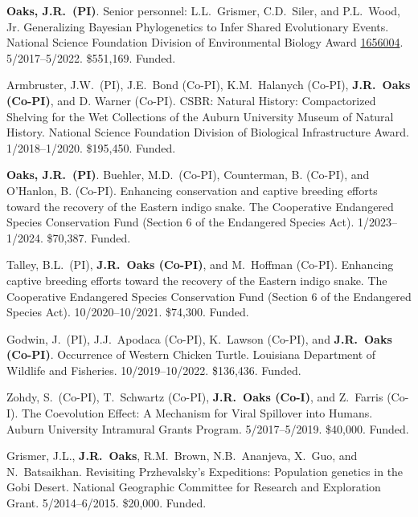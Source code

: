 \myHangIndent
\textbf{Oaks, J.R.\ (PI)}.
Senior personnel: L.L.\ Grismer, C.D.\ Siler, and \postdocsymbol{}P.L.\ Wood, Jr.
Generalizing Bayesian Phylogenetics to Infer Shared Evolutionary Events.
National Science Foundation Division of Environmental Biology Award
\href{https://www.nsf.gov/awardsearch/showAward?AWD_ID=1656004&HistoricalAwards=false}{1656004}.
5/2017--5/2022.
\$551,169.
Funded.

\myHangIndent
Armbruster, J.W.\ (PI),
J.E.\ Bond (Co-PI),
K.M.\ Halanych (Co-PI),
\textbf{J.R.\ Oaks (Co-PI)},
and
D. Warner (Co-PI).
CSBR: Natural History: Compactorized Shelving for the Wet Collections of the
Auburn University Museum of Natural History.
National Science Foundation Division of Biological Infrastructure Award.
1/2018--1/2020.
\$195,450.
Funded.


\myHangIndent
\textbf{Oaks, J.R.\ (PI)}.
\phdsymbol{}Buehler, M.D.\ (Co-PI),
Counterman, B. (Co-PI),
and
O'Hanlon, B. (Co-PI).
Enhancing conservation and captive breeding efforts toward the recovery of the Eastern indigo snake.
The Cooperative Endangered Species Conservation Fund (Section 6 of the
Endangered Species Act).
1/2023--1/2024.
\$70,387.
Funded.

\myHangIndent
Talley, B.L.\ (PI),
\textbf{J.R.\ Oaks (Co-PI)},
and
M.\ Hoffman (Co-PI).
Enhancing captive breeding efforts toward the recovery of the Eastern indigo snake.
The Cooperative Endangered Species Conservation Fund (Section 6 of the
Endangered Species Act).
10/2020--10/2021.
\$74,300.
Funded.

\myHangIndent
Godwin, J.\ (PI),
J.J.\ Apodaca (Co-PI),
K.\ Lawson (Co-PI),
and
\textbf{J.R.\ Oaks (Co-PI)}.
Occurrence of Western Chicken Turtle.
Louisiana Department of Wildlife and Fisheries.
10/2019--10/2022.
\$136,436.
Funded.

\myHangIndent
Zohdy, S.\ (Co-PI), T.\ Schwartz (Co-PI), \textbf{J.R.\ Oaks (Co-I)}, and Z.\ Farris (Co-I).
The Coevolution Effect: A Mechanism for Viral Spillover into Humans.
Auburn University Intramural Grants Program.
5/2017--5/2019.
\$40,000.
Funded.

\myHangIndent
Grismer, J.L., \textbf{J.R.\ Oaks}, R.M.\ Brown, N.B.\ Ananjeva, X.\ Guo, and N.\
Batsaikhan.
Revisiting Przhevalsky's Expeditions: Population genetics in the Gobi Desert.
National Geographic Committee for Research and Exploration Grant.
5/2014--6/2015.
\$20,000.
Funded.

